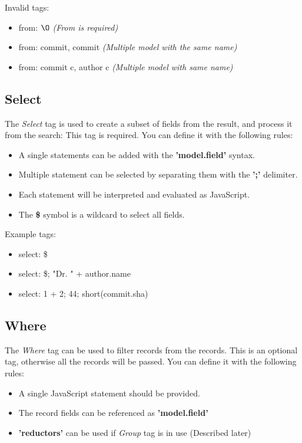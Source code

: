 Invalid tags:
\begin{itemize}
	\item from: $\O$ \textit{(From is required)}
	\item from: commit, commit \textit{(Multiple model with the same name)}
	\item from: commit c, author c \textit{(Multiple model with same name)}
\end{itemize}

\subsection{Select}

The \textit{Select} tag is used to create a subset of fields from the result, and process it from the search:
This tag is required.
You can define it with the following rules:

\begin{itemize}
	\item A single statements can be added with the \textbf{'{model}.{field}'} syntax.
	\item Multiple statement can be selected by separating them with the \textbf{';'} delimiter.
	\item Each statement will be interpreted and evaluated as JavaScript.
	\item The \textbf{\$} symbol is a wildcard to select all fields. 
\end{itemize}

Example tags:
\begin{itemize}
	\item select: \$
	\item select: \$; "Dr. " + author.name
	\item select: 1 + 2; 44; short(commit.sha)
\end{itemize}

\subsection{Where}

The \textit{Where} tag can be used to filter records from the records.
This is an optional tag, otherwise all the records will be passed.
You can define it with the following rules:

\begin{itemize}
	\item A single JavaScript statement should be provided.
	\item The record fields can be referenced as \textbf{'{model}.{field}'}
	\item \textbf{'reductors'} can be used if \textit{Group} tag is in use (Described later)
\end{itemize}


